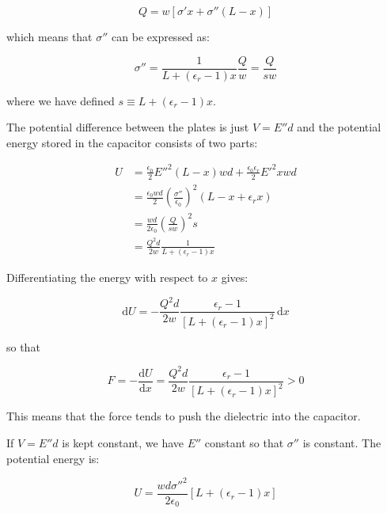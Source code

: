 \documentclass[12pt]{article}
\begin{document}
\begin{equation}
    Q = w \left[ \sigma' x + \sigma''(L - x) \right]
\end{equation}

which means that $\sigma''$ can be expressed as:

\begin{equation}
    \sigma'' = \frac{1}{L + (\epsilon_{r} - 1)x} \frac{Q}{w} = \frac{Q}{sw}
\end{equation}

where we have defined $s \equiv L + (\epsilon_{r} - 1)x$.

The potential difference between the plates is just $V = E'' d$ and the potential energy stored in the capacitor consists of two parts:

\begin{equation}
    \begin{split}
        U &= \frac{\epsilon_{0}}{2} E''^{2} (L-x)wd + \frac{\epsilon_{0} \epsilon_{r}}{2} E'^{2} xwd \\
        &= \frac{\epsilon_{0}wd}{2} \left( \frac{\sigma''}{\epsilon_{0}} \right)^{2} (L - x + \epsilon_{r} x) \\
        &= \frac{wd}{2\epsilon_{0}} \left( \frac{Q}{sw} \right)^{2} s \\
        &= \frac{Q^{2}d}{2w} \frac{1}{L + (\epsilon_{r} - 1)x}
    \end{split}
\end{equation}

Differentiating the energy with respect to $x$ gives:

\begin{equation}
    \mathrm{d}U = -\frac{Q^{2}d}{2w} \frac{\epsilon_{r} - 1}{[L + (\epsilon_{r} - 1)x]^{2}} \, \mathrm{d}x
\end{equation}

so that

\begin{equation}
    F = -\frac{\mathrm{d}U}{\mathrm{d}x} = \frac{Q^{2}d}{2w} \frac{\epsilon_{r} - 1}{[L + (\epsilon_{r} - 1)x]^{2}} > 0
\end{equation}

This means that the force tends to push the dielectric into the capacitor.

If $V = E'' d$ is kept constant, we have $E''$ constant so that $\sigma''$ is constant. The potential energy is:

\begin{equation}
    U = \frac{wd\sigma''^{2}}{2\epsilon_{0}} \left[ L + (\epsilon_{r} - 1)x \right]
\end{equation}
\end{document}
